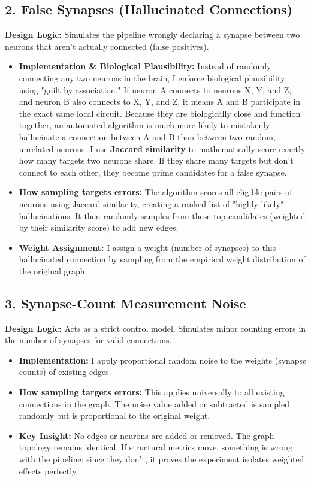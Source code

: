\documentclass[11pt]{article}
\begin{document}
\subsection*{2. False Synapses (Hallucinated Connections)}
\textbf{Design Logic:} Simulates the pipeline wrongly declaring a synapse between two neurons that aren't actually connected (false positives).
\begin{itemize}
    \item \textbf{Implementation \& Biological Plausibility:} Instead of randomly connecting any two neurons in the brain, I enforce biological plausibility using "guilt by association." If neuron A connects to neurons X, Y, and Z, and neuron B also connects to X, Y, and Z, it means A and B participate in the exact same local circuit. Because they are biologically close and function together, an automated algorithm is much more likely to mistakenly hallucinate a connection between A and B than between two random, unrelated neurons. I use \textbf{Jaccard similarity} to mathematically score exactly how many targets two neurons share. If they share many targets but don't connect to each other, they become prime candidates for a false synapse.
    \item \textbf{How sampling targets errors:} The algorithm scores all eligible pairs of neurons using Jaccard similarity, creating a ranked list of "highly likely" hallucinations. It then randomly samples from these top candidates (weighted by their similarity score) to add new edges.
    \item \textbf{Weight Assignment:} I assign a weight (number of synapses) to this hallucinated connection by sampling from the empirical weight distribution of the original graph.
\end{itemize}

\subsection*{3. Synapse-Count Measurement Noise}
\textbf{Design Logic:} Acts as a strict control model. Simulates minor counting errors in the number of synapses for valid connections.
\begin{itemize}
    \item \textbf{Implementation:} I apply proportional random noise to the weights (synapse counts) of existing edges.
    \item \textbf{How sampling targets errors:} This applies universally to all existing connections in the graph. The noise value added or subtracted is sampled randomly but is proportional to the original weight.
    \item \textbf{Key Insight:} No edges or neurons are added or removed. The graph topology remains identical. If structural metrics move, something is wrong with the pipeline; since they don't, it proves the experiment isolates weighted effects perfectly.
\end{itemize}
\end{document}

